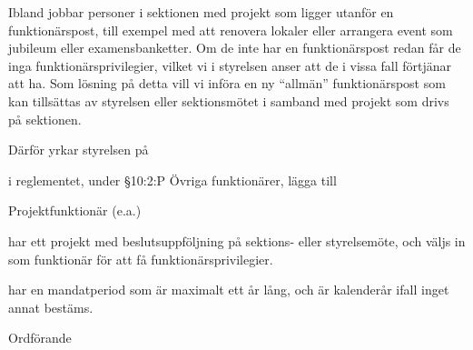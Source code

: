 \documentclass[../_main/handlingar.tex]{subfiles}
\begin{document}

Ibland jobbar personer i sektionen med projekt som ligger utanför en funktionärspost, till exempel med att renovera lokaler eller arrangera event som jubileum eller examensbanketter. Om de inte har en funktionärspost redan får de inga funktionärsprivilegier, vilket vi i styrelsen anser att de i vissa fall förtjänar att ha. Som lösning på detta vill vi införa en ny ``allmän'' funktionärspost som kan tillsättas av styrelsen eller sektionsmötet i samband med projekt som drivs på sektionen.

Därför yrkar styrelsen på

\begin{attsatser}
    \att i reglementet, under \S10:2:P Övriga funktionärer, lägga till\par
    \begin{itshape}
        Projektfunktionär (e.a.)
        \begin{tightdashlist}
            \item har ett projekt med beslutsuppföljning på sektions- eller styrelsemöte, och väljs in som funktionär för att få funktionärsprivilegier.
            \item har en mandatperiod som är maximalt ett år lång, och är kalenderår ifall inget annat bestäms.
        \end{tightdashlist}
    \end{itshape}
\end{attsatser}

\begin{signatures}{1}
    \ist
    \signature{\ordf}{Ordförande}
\end{signatures}
\end{document}
